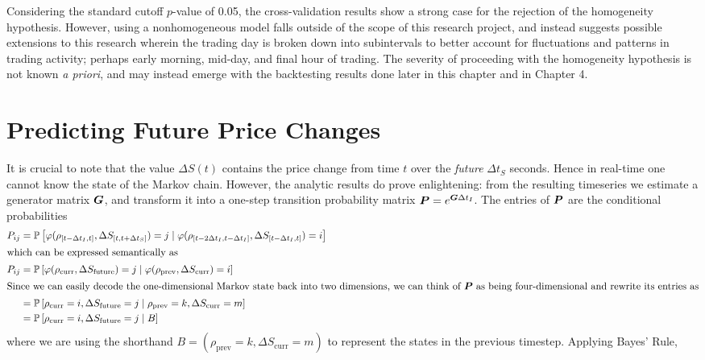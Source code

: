 Considering the standard cutoff $p$-value of 0.05, the cross-validation results show a strong case for the rejection of the homogeneity hypothesis. However, using a nonhomogeneous model falls outside of the scope of this research project, and instead suggests possible extensions to this research wherein the trading day is broken down into subintervals to better account for fluctuations and patterns in trading activity; perhaps early morning, mid-day, and final hour of trading. The severity of proceeding with the homogeneity hypothesis is not known \textit{a priori}, and may instead emerge with the backtesting results done later in this chapter and in Chapter 4.

\section{Predicting Future Price Changes}
It is crucial to note that the value $\Delta S(t)$ contains the price change from time $t$ over the \textit{future} $\Delta t_S$ seconds. Hence in real-time one cannot know the state of the Markov chain. However, the analytic results do prove enlightening: from the resulting timeseries we estimate a generator matrix $\boldsymbol{G}$, and transform it into a one-step transition probability matrix $\boldsymbol{P} = e^{\boldsymbol{G}\Delta t_I}$. The entries of $\boldsymbol{P}$ are the conditional probabilities 
\begin{align}
P_{ij} & = \mathbb{P}\left[ \varphi( \rho_{[t-\Delta t_I, t]}, \Delta S_{[t,t+\Delta t_S]}) = j \; | \; \varphi( \rho_{[t-2\Delta t_I, t-\Delta t_I]}, \Delta S_{[t-\Delta t_I, t]} ) = i \right] \label{eq:POneStepUgly} \\
\intertext{which can be expressed semantically as}
P_{ij} & = \mathbb{P}\left[ \varphi( \rho_\text{curr}, \Delta S_\text{future}) = j \; | \; \varphi( \rho_\text{prev}, \Delta S_\text{curr} ) = i \right] \label{eq:POneStepNice} \\
\intertext{Since we can easily decode the one-dimensional Markov state back into two dimensions, we can think of $\boldsymbol{P}$ as being four-dimensional and rewrite its entries as}
& = \mathbb{P}\left[ \rho_\text{curr} = i,  \Delta S_\text{future} = j \; | \; \rho_\text{prev} = k, \Delta S_\text{curr} = m \right] \\
& = \mathbb{P}\left[ \rho_\text{curr} = i,  \Delta S_\text{future} = j \; | \; B \right]
\end{align}
where we are using the shorthand $B = (\rho_\text{prev} = k, \Delta S_\text{curr} = m)$ to represent the states in the previous timestep. Applying Bayes' Rule,
